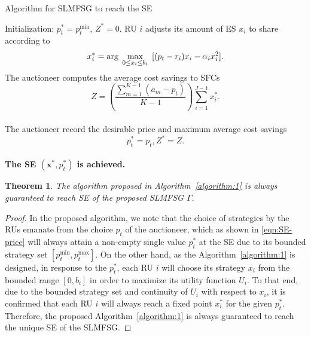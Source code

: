 \documentclass[journal,10pt]{IEEEtran}
\newtheorem{theorem}{\bf Theorem}
\begin{document}
\begin{algorithm}[h]
\caption{Algorithm for SLMFSG to reach the SE}
\label{algorithm:1}
\begin{algorithmic}[1]
\small
\STATE Initialization: $p_t^*=p_t^\text{min}$, $Z^*=0$.
        \STATE RU $i$ adjusts its amount of ES $x_i$ to share according to
        \begin{equation}\label{eqn:alg-1}
           x_i^* = {\rm{arg}}{\kern 1pt} {\kern 1pt} {\kern 1pt} \mathop {\max }\limits_{0 \le {x_i} \le b_i} {\kern 1pt} {\kern 1pt} {\kern 1pt} [(p_t - r_i)x_i - \alpha_i x_i^2].
        \end{equation}
   \ENDFOR
    \STATE The auctioneer computes the average cost savings to SFCs
        \begin{equation}\label{eqn:alg-2}
    {Z} = \left(\frac{\sum_{m=1}^{K-1}(a_m-p_t)}{K-1}\right)\sum_{i=1}^{J-1} x_i^*.
        \end{equation} \\
         \STATE The auctioneer record the desirable price and maximum average cost savings
         \begin{equation}\label{eqn:alg-3}
           p_t^* = p_t, Z^* = Z.
         \end{equation}
     \ENDIF
\ENDFOR\\
\textbf{The SE $(\mathbf{x}^*, p_t^*)$ is achieved.}
\end{algorithmic}
\end{algorithm}
\begin{theorem}
The algorithm proposed in Algorithm~\ref{algorithm:1} is always guaranteed to reach SE of the proposed SLMFSG $\Gamma$.
\label{theorem:2}
\end{theorem}
\begin{proof}
In the proposed algorithm, we note that the choice of strategies by the RUs emanate from the choice $p_t$ of the auctioneer, which as shown in \eqref{eqn:SE-price} will always attain a non-empty single value $p_t^*$ at the SE due to its bounded strategy set $[p_t^\text{min},p_t^\text{max}]$. On the other hand, as the Algorithm~\ref{algorithm:1} is designed, in response to the $p_t^*$, each RU $i$ will choose its strategy $x_i$ from the bounded range $[0,b_i]$ in order to maximize its utility function $U_i$. To that end, due to the bounded strategy set and continuity of $U_i$ with respect to $x_i$, it is confirmed that each RU $i$ will always reach a fixed point $x_i^*$ for the given $p_t^*$. Therefore, the proposed Algorithm~\ref{algorithm:1} is always guaranteed to reach the unique SE of the SLMFSG.
\end{proof}
\end{document}
